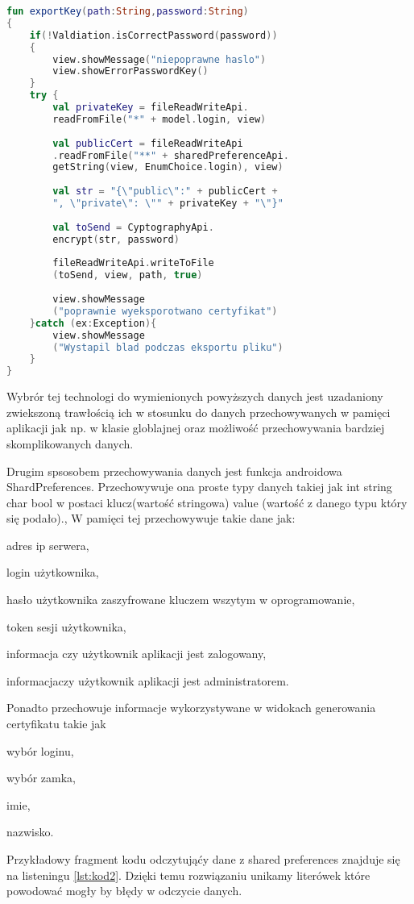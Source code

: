 	\begin{lstlisting}[caption={Funkcja eksportująca klucz szyfrujący.}, label={lst:kod1}, language=Kotlin]
fun exportKey(path:String,password:String)
{
	if(!Valdiation.isCorrectPassword(password))
	{
		view.showMessage("niepoprawne haslo")
		view.showErrorPasswordKey()
	}
	try {
		val privateKey = fileReadWriteApi.
		readFromFile("*" + model.login, view)
		
		val publicCert = fileReadWriteApi
		.readFromFile("**" + sharedPreferenceApi.
		getString(view, EnumChoice.login), view)
		
		val str = "{\"public\":" + publicCert +
 		", \"private\": \"" + privateKey + "\"}"
 		
		val toSend = CyptographyApi.
		encrypt(str, password)
		
		fileReadWriteApi.writeToFile
		(toSend, view, path, true)
		
		view.showMessage
		("poprawnie wyeksporotwano certyfikat")
	}catch (ex:Exception){
		view.showMessage
		("Wystapil blad podczas eksportu pliku")
	}
}

	\end{lstlisting}	
	Wybrór  tej technologi do wymienionych powyższych danych jest uzadaniony zwiekszoną trawłością ich w stosunku do danych przechowywanych w pamięci aplikacji jak np.  w klasie globlajnej oraz możliwość przechowywania bardziej skomplikowanych danych.

	
	Drugim spsosobem przechowywania danych jest funkcja androidowa ShardPreferences. Przechowywuje ona proste typy danych takiej jak int string char bool w postaci klucz(wartość stringowa) value (wartość z danego typu który się podało)., W pamięci tej przechowywuje takie dane jak:
	\begin{itemize*}
		\item 	adres ip serwera,
		\item login użytkownika,
		\item hasło użytkownika zaszyfrowane kluczem wszytym w oprogramowanie,
		\item token sesji użytkownika,
		\item informacja czy użytkownik aplikacji jest zalogowany,
		\item informacjaczy użytkownik aplikacji jest administratorem.	
	\end{itemize*}
	Ponadto przechowuje informacje wykorzystywane w widokach generowania certyfikatu takie jak
	\begin{itemize*}
		\item wybór loginu,
		\item wybór zamka,
		\item imie, 
		\item nazwisko.
	\end{itemize*}	
	Przykładowy fragment kodu odczytująćy dane z shared preferences znajduje się na listeningu \ref{lst:kod2}. Dzięki temu rozwiązaniu unikamy literówek które powodować mogły by błędy w odczycie danych. 
		
